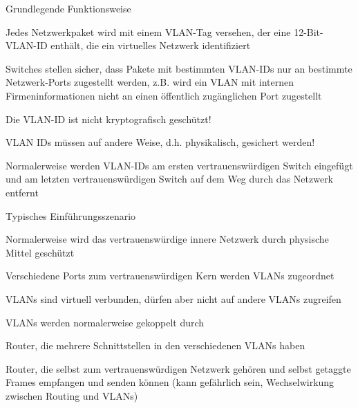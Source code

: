 \documentclass[a4paper]{article}
\begin{document}
\begin{multicols}{3}
      Grundlegende Funktionsweise
      \begin{itemize*}
            \item Jedes Netzwerkpaket wird mit einem VLAN-Tag versehen, der eine 12-Bit-VLAN-ID enthält, die ein virtuelles Netzwerk identifiziert
            \item Switches stellen sicher, dass Pakete mit bestimmten VLAN-IDs nur an bestimmte Netzwerk-Ports zugestellt werden, z.B. wird ein VLAN mit internen Firmeninformationen nicht an einen öffentlich zugänglichen Port zugestellt
            \item Die VLAN-ID ist nicht kryptografisch geschützt!
            \begin{itemize*}
                  \item VLAN IDs müssen auf andere Weise, d.h. physikalisch, gesichert werden!
                  \item Normalerweise werden VLAN-IDs am ersten vertrauenswürdigen Switch eingefügt und am letzten vertrauenswürdigen Switch auf dem Weg durch das Netzwerk entfernt
            \end{itemize*}
      \end{itemize*}

      Typisches Einführungsszenario
      \begin{itemize*}
            \item Normalerweise wird das vertrauenswürdige innere Netzwerk durch physische Mittel geschützt
            \item Verschiedene Ports zum vertrauenswürdigen Kern werden VLANs zugeordnet
            \item VLANs sind virtuell verbunden, dürfen aber nicht auf andere VLANs zugreifen
            \item VLANs werden normalerweise gekoppelt durch
            \begin{itemize*}
                  \item Router, die mehrere Schnittstellen in den verschiedenen VLANs haben
                  \item Router, die selbst zum vertrauenswürdigen Netzwerk gehören und selbst getaggte Frames empfangen und senden können (kann gefährlich sein, Wechselwirkung zwischen Routing und VLANs)
            \end{itemize*}
      \end{itemize*}


\end{multicols}
\end{document}
